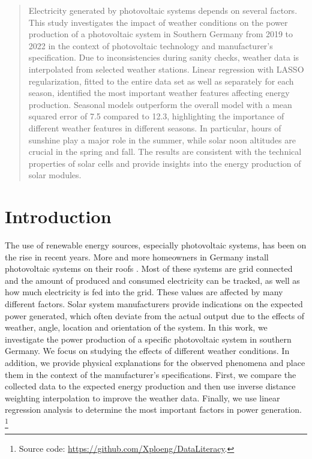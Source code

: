 \documentclass{article}
\begin{document}
\printAffiliationsAndNotice{\icmlEqualContribution} %

\begin{abstract}
Electricity generated by photovoltaic systems depends on several factors. This study investigates the impact of weather conditions on the power production of a photovoltaic system in Southern Germany from 2019 to 2022 in the context of photovoltaic technology and manufacturer's specification. Due to inconsistencies during sanity checks, weather data is interpolated from selected weather stations. Linear regression with LASSO regularization, fitted to the entire data set as well as separately for each season, identified the most important weather features affecting energy production. Seasonal models outperform the overall model with a mean squared error of 7.5 compared to 12.3, highlighting the importance of different weather features in different seasons. In particular, hours of sunshine play a major role in the summer, while solar noon altitudes are crucial in the spring and fall. The results are consistent with the technical properties of solar cells and provide insights into the energy production of solar modules. 
\end{abstract}
\section{Introduction}\label{sec:intro}
The use of renewable energy sources, especially photovoltaic systems, has been on the rise in recent years. More and more homeowners in Germany install photovoltaic systems on their roofs \citep{Fraunhofer2023}. 
Most of these systems are grid connected and the amount of produced and consumed electricity can be tracked, as well as how much electricity is fed into the grid. These values are affected by many different factors. Solar system manufacturers provide indications on the expected power generated, which often deviate from the actual output due to the effects of weather, angle, location and orientation of the system. In this work, we investigate the power production of a specific photovoltaic system in southern Germany. We focus on studying the effects of different weather conditions. In addition, we provide physical explanations for the observed phenomena and place them in the context of the manufacturer's specifications.
First, we compare the collected data to the expected energy production and then use inverse distance weighting interpolation to improve the weather data. Finally, we use linear regression analysis to determine the most important factors in power generation. \footnote{Source code: \href{https://github.com/Xploeng/DataLiteracy} {https://github.com/Xploeng/DataLiteracy}.}
\end{document}
